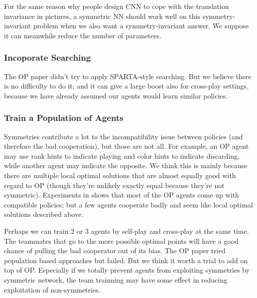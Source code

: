 \documentclass[11pt]{article}
\begin{document}
For the same reason why people design CNN to cope with the translation invariance in pictures, a symmetric NN should work well on this symmetry-invariant problem when we also want a symmetry-invariant answer. We suppose it can meanwhile reduce the number of parameters.

\subsubsection{Incoporate Searching}

The OP paper\cite{hu2020other} didn't try to apply SPARTA-style searching. But we believe there is no difficulty to do it; and it can give a large boost also for cross-play settings, because we have already assumed our agents would learn similar policies.

\subsubsection{Train a Population of Agents}

Symmetries contribute a lot to the incompatibility issue between policies (and therefore the bad cooperation), but those are not all. For example, an OP agent may use rank hints to indicate playing and color hints to indicate discarding, while another agent may indicate the opposite. We think this is mainly because there are multiple local optimal solutions that are almost equally good with regard to OP (though they're unlikely exactly equal because they're not symmetric). Experiments in \cite{hu2020other} shows that most of the OP agents come up with compatible policies; but a few agents cooperate badly and seem like local optimal solutions described above.

Perhaps we can train 2 or 3 agents by self-play and cross-play at the same time. The teammates that go to the more possible optimal points will have a good chance of pulling the bad cooperator out of its bias. The OP paper\cite{hu2020other} tried population based approaches but failed. But we think it worth a trial to add on top of OP. Especially if we totally prevent agents from exploiting symmetries by symmetric network, the team trainning may have some effect in reducing exploitation of non-symmetries.

\end{document}
